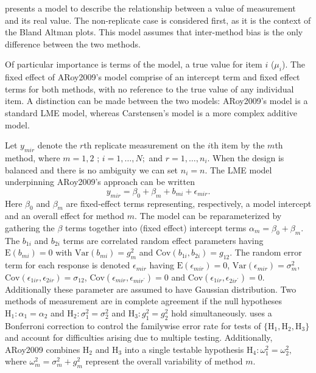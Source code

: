 \documentclass[12pt, a4paper]{report}
\theoremstyle{plain}
\theoremstyle{definition}
\theoremstyle{remark}
\begin{document}
	
	
	\citet{BXC2004} presents a model to describe the relationship between a value of measurement and its
	real value. The non-replicate case is considered first, as it is the context of the Bland Altman plots. This model assumes that inter-method bias is the only difference between the two methods.
	
	
	
	Of particular importance is terms of the model, a true value for item $i$ ($\mu_{i}$).  The fixed effect of ARoy2009's model comprise of an intercept term and fixed effect terms for both methods, with no reference to the true value of any individual item. A distinction can be made between the two models: ARoy2009's model is a standard LME model, whereas Carstensen's model is a more complex additive model.
	
	
	
	Let $y_{mir} $ denote the $r$th replicate measurement on the $i$th item by the $m$th method, where $m=1,2$ ; $i=1,\ldots,N;$ and $r = 1,\ldots,n_i.$ When the design is balanced and there is no ambiguity we can set $n_i=n.$ The LME model underpinning ARoy2009's approach can be written
	\begin{equation}\label{ARoy2009-model}
	y_{mir} = \beta_{0} + \beta_{m} + b_{mi} + \epsilon_{mir}.
	\end{equation}
	Here $\beta_0$ and $\beta_m$ are fixed-effect terms representing, respectively, a model intercept and an overall effect for method $m.$ The model can be reparameterized by gathering the $\beta$ terms together into (fixed effect) intercept terms $\alpha_m=\beta_0+\beta_m.$ The $b_{1i}$ and $b_{2i}$ terms are correlated random effect parameters having $\mathrm{E}(b_{mi})=0$ with $\mathrm{Var}(b_{mi})=g^2_m$ and $\mathrm{Cov}(b_{1i}, b_{2 i})=g_{12}.$ The random error term for each response is denoted $\epsilon_{mir}$ having $\mathrm{E}(\epsilon_{mir})=0$, $\mathrm{Var}(\epsilon_{mir})=\sigma^2_m$, $\mathrm{Cov}(\epsilon_{1ir}, \epsilon_{2 ir})=\sigma_{12}$, $\mathrm{Cov}(\epsilon_{mir}, \epsilon_{mir^\prime})= 0$ and $\mathrm{Cov}(\epsilon_{1ir}, \epsilon_{2 ir^\prime})= 0.$ Additionally these parameter are assumed to have Gaussian distribution. Two methods of measurement are in complete agreement if the null hypotheses $\mathrm{H}_1\colon \alpha_1 = \alpha_2$ and $\mathrm{H}_2\colon \sigma^2_1 = \sigma^2_2 $ and $\mathrm{H}_3\colon g^2_1= g^2_2$ hold simultaneously. \citet{ARoy2009} uses a Bonferroni correction to control the familywise error rate for tests of $\{\mathrm{H}_1, \mathrm{H}_2, \mathrm{H}_3\}$ and account for difficulties arising due to multiple testing. Additionally, ARoy2009 combines $\mathrm{H}_2$ and $\mathrm{H}_3$ into a single testable hypothesis $\mathrm{H}_4\colon \omega^2_1=\omega^2_2,$ where $\omega^2_m = \sigma^2_m + g^2_m$ represent the overall variability of method $m.$
	
\end{document}
